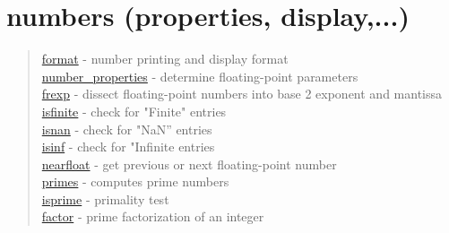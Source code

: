 \chapter*{numbers (properties, display,...)} 


\begin{quote}
\noindent
\hyperlink{format}{format} - number printing and display format\\
\hyperlink{number_properties}{number\_properties} - determine floating-point parameters \\
\hyperlink{frexp}{frexp} - dissect floating-point numbers into base 2 exponent and mantissa\\
\hyperlink{isfinite}{isfinite} - check for "Finite" entries \\
\hyperlink{isnan}{isnan} - check for "NaN'' entries \\
\hyperlink{isnan}{isinf} - check for "Infinite entries \\
\hyperlink{nearfloat}{nearfloat} - get previous or next floating-point number\\
\hyperlink{primes}{primes} - computes prime numbers\\
\hyperlink{isprime}{isprime} - primality test\\
\hyperlink{factor}{factor} - prime factorization of an integer\\
\end{quote}





 
 
 
 
 

